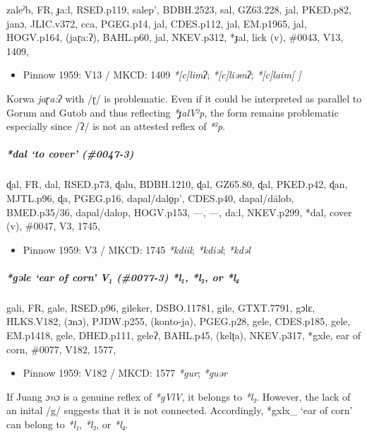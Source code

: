 \documentclass[a4paper,]{article}
\providecommand{\tightlist}{%
  \setlength{\itemsep}{0pt}\setlength{\parskip}{0pt}}
\let\oldsubparagraph\subparagraph
\renewcommand{\subparagraph}[1]{\oldsubparagraph{#1}\mbox{}}
\begin{document}
zaleˀb, FR, ɟa:l, RSED.p119, salep', BDBH.2523, sal, GZ63.228, jal,
PKED.p82, janɔ, JLIC.v372, cca, PGEG.p14, jal, CDES.p112, jal, EM.p1965,
jal, HOGV.p164, (jaɽa:ʔ), BAHL.p60, jal, NKEV.p312, *ɟal, lick (v),
\#0043, V13, 1409,

\begin{itemize}
\tightlist
\item
  Pinnow 1959: V13 / MKCD: 1409 \emph{*{[}c{]}limʔ};
  \emph{*{[}c{]}liəmʔ}; \emph{*{[}c{]}laim{[} {]}}
\end{itemize}

Korwa \emph{jaɽa:ʔ} with /ɽ/ is problematic. Even if it could be
interpreted as parallel to Gorum and Gutob and thus reflecting
\emph{*ɟalVˀp}, the form remains problematic especially since /ʔ/ is not
an attested reflex of \emph{*ˀp}.

\subparagraph{\texorpdfstring{\emph{*dal} `to cover'
(\#0047-3)}{*dal to cover (\#0047-3)}}\label{dal-to-cover-0047-3}

ɖal, FR, dal, RSED.p73, ɖalu, BDBH.1210, ɖal, GZ65.80, ɖal, PKED.p42,
ɖan, MJTL.p96, ɖa, PGEG.p16, dapal/dalo̠p', CDES.p40, dapal/dālob,
BMED.p35/36, dapal/dalop, HOGV.p153, ---, ---, da:l, NKEV.p299, *dal,
cover (v), \#0047, V3, 1745,

\begin{itemize}
\tightlist
\item
  Pinnow 1959: V3 / MKCD: 1745 \emph{*kdiil}; \emph{*kdiəl};
  \emph{*kdəl}
\end{itemize}

\subparagraph{\texorpdfstring{\emph{*gəle} `ear of corn' V₁ (\#0077-3)
\emph{*l₁}, \emph{*l₃}, or
\emph{*l₄}}{*gəle ear of corn V₁ (\#0077-3) *l₁, *l₃, or *l₄}}\label{gux259le-ear-of-corn-v-0077-3-l-l-or-l}

gali, FR, gale, RSED.p96, gileker, DSBO.11781, gile, GTXT.7791, gɔlɛ,
HLKS.V182, (ɔnɔ), PJDW.p255, (konto-ja), PGEG.p28, gele, CDES.p185,
gele, EM.p1418, gele, DHED.p111, geleʔ, BAHL.p45, (kelʈa), NKEV.p317,
*gxle, ear of corn, \#0077, V182, 1577,

\begin{itemize}
\tightlist
\item
  Pinnow 1959: V182 / MKCD: 1577 \emph{*gur}; \emph{*guər}
\end{itemize}

If Juang \emph{ɔnɔ} is a genuine reflex of \emph{*gVlV}, it belongs to
\emph{*l₃}. However, the lack of an inital /g/ suggests that it is not
connected. Accordingly, *gxlx\_ `ear of corn' can belong to \emph{*l₁},
\emph{*l₃}, or \emph{*l₄}.
\end{document}
